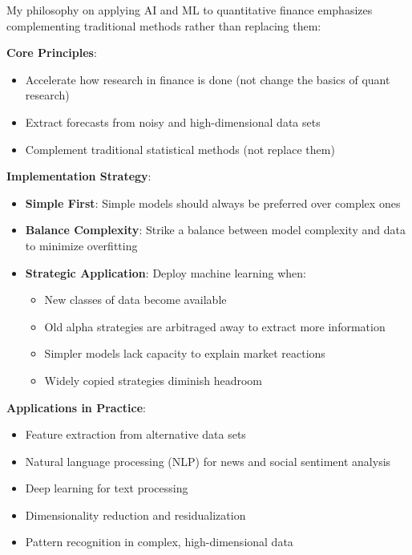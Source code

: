 \documentclass[11pt, letterpaper]{article}
\begin{document}
  My philosophy on applying AI and ML to quantitative finance emphasizes
  complementing traditional methods rather than replacing them:

  \textbf{Core Principles}:

  \begin{itemize}
    \item Accelerate how research in finance is done (not change the
      basics of quant research)

    \item Extract forecasts from noisy and high-dimensional data sets

    \item Complement traditional statistical methods (not replace them)
  \end{itemize}

  \textbf{Implementation Strategy}:

  \begin{itemize}
    \item \textbf{Simple First}: Simple models should always be preferred
      over complex ones

    \item \textbf{Balance Complexity}: Strike a balance between model complexity
      and data to minimize overfitting

    \item \textbf{Strategic Application}: Deploy machine learning when:

      \begin{itemize}
        \item New classes of data become available

        \item Old alpha strategies are arbitraged away to extract more information

        \item Simpler models lack capacity to explain market reactions

        \item Widely copied strategies diminish headroom
      \end{itemize}
  \end{itemize}

  \textbf{Applications in Practice}:

  \begin{itemize}
    \item Feature extraction from alternative data sets

    \item Natural language processing (NLP) for news and social sentiment
      analysis

    \item Deep learning for text processing

    \item Dimensionality reduction and residualization

    \item Pattern recognition in complex, high-dimensional data
  \end{itemize}
\end{document}
